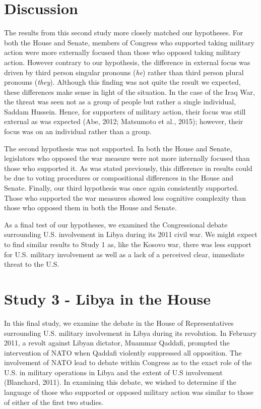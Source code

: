\documentclass[english,,man]{apa6}
\begin{document}
\hypertarget{discussion-1}{%
\section{Discussion}\label{discussion-1}}

The results from this second study more closely matched our hypotheses. For both the House and Senate, members of Congress who supported taking military action were more externally focused than those who opposed taking military action. However contrary to our hypothesis, the difference in external focus was driven by third person singular pronouns (\emph{he}) rather than third person plural pronouns (\emph{they}). Although this finding was not quite the result we expected, these differences make sense in light of the situation. In the case of the Iraq War, the threat was seen not as a group of people but rather a single individual, Saddam Hussein. Hence, for supporters of military action, their focus was still external as was expected (Abe, 2012; Matsumoto et al., 2015); however, their focus was on an individual rather than a group.

The second hypothesis was not supported. In both the House and Senate, legislators who opposed the war measure were not more internally focused than those who supported it. As was stated previously, this difference in results could be due to voting procedures or compositional differences in the House and Senate. Finally, our third hypothesis was once again consistently supported. Those who supported the war measures showed less cognitive complexity than those who opposed them in both the House and Senate.

As a final test of our hypotheses, we examined the Congressional debate surrounding U.S. involvement in Libya during its 2011 civil war. We might expect to find similar results to Study 1 as, like the Kosovo war, there was less support for U.S. military involvement as well as a lack of a perceived clear, immediate threat to the U.S.

\hypertarget{study-3---libya-in-the-house}{%
\section{Study 3 - Libya in the House}\label{study-3---libya-in-the-house}}

In this final study, we examine the debate in the House of Representatives surrounding U.S. military involvement in Libya during its revolution. In February 2011, a revolt against Libyan dictator, Muammar Qaddafi, prompted the intervention of NATO when Qaddafi violently suppressed all opposition. The involvement of NATO lead to debate within Congress as to the exact role of the U.S. in military operations in Libya and the extent of U.S involvement (Blanchard, 2011). In examining this debate, we wished to determine if the language of those who supported or opposed military action was similar to those of either of the first two studies.
\end{document}
